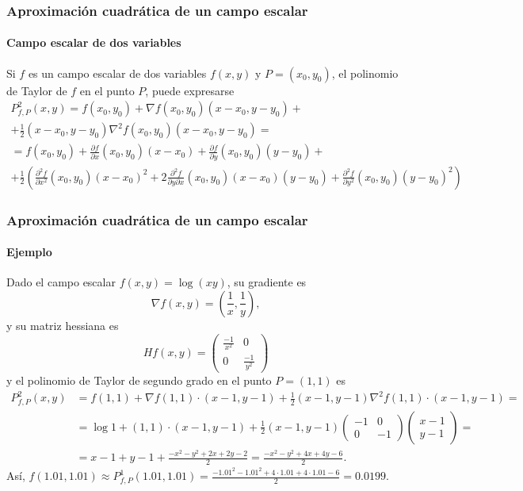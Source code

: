 \begin{frame}
	\frametitle{Aproximación cuadrática de un campo escalar}
	\framesubtitle{Campo escalar de dos variables}
	Si $f$ es un campo escalar de dos variables $f(x,y)$ y $P=(x_0,y_0)$, el polinomio de Taylor de $f$ en el punto $P$, puede expresarse
	\begin{multline*}
		P^2_{f,P}(x,y) = f(x_0,y_0)+\nabla f(x_0,y_0)(x-x_0,y-y_0) +\\
		+\frac{1}{2}(x-x_0,y-y_0)\nabla^2f(x_0,y_0)(x-x_0,y-y_0)= \\
		= f(x_0,y_0)+\frac{\partial f}{\partial x}(x_0,y_0)(x-x_0)+\frac{\partial f}{\partial y}(x_0,y_0)(y-y_0)+\\
		+\frac{1}{2}\left(\frac{\partial^2 f}{\partial x^2}(x_0,y_0) (x-x_0)^2 + 2\frac{\partial^2 f}{\partial y\partial x}(x_0,y_0) (x-x_0)(y-y_0) + \frac{\partial^2 f}{\partial y^2}(x_0,y_0) (y-y_0)^2\right)
	\end{multline*}
\end{frame}


\begin{frame}
	\frametitle{Aproximación cuadrática de un campo escalar}
	\framesubtitle{Ejemplo}
	Dado el campo escalar $f(x,y)=\log(xy)$, su gradiente es
	\[
		\nabla f(x,y) = \left(\frac{1}{x},\frac{1}{y}\right),
	\]
	y su matriz hessiana es 
	\[
		Hf(x,y) = \left(
		\begin{array}{cc}
			\frac{-1}{x^2} & 0              \\
			0              & \frac{-1}{y^2} 
		\end{array}
		\right)
	\]
	y el polinomio de Taylor de segundo grado en el punto $P=(1,1)$ es
	\begin{align*}
		P^2_{f,P}(x,y) & = f(1,1) +\nabla f(1,1)\cdot (x-1,y-1) + \frac{1}{2}(x-1,y-1)\nabla^2f(1,1)\cdot(x-1,y-1)= \\
		               & = \log 1+(1,1)\cdot(x-1,y-1) + \frac{1}{2}(x-1,y-1)                                        
		\left(
		\begin{array}{cc}
		-1             & 0                                                                                          \\
		0              & -1                                                                                         
		\end{array}
		\right)
		\left(
		\begin{array}{c}
		x-1\\
		y-1
		\end{array}
		\right)
		= \\
		               & = x-1+y-1+\frac{-x^2-y^2+2x+2y-2}{2} = \frac{-x^2-y^2+4x+4y-6}{2}.                         
	\end{align*}
	Así, $f(1.01,1.01) \approx P^1_{f,P}(1.01,1.01) = \frac{-1.01^2-1.01^2+4\cdot 1.01+4\cdot 1.01-6}{2} = 0.0199$.
\end{frame}



